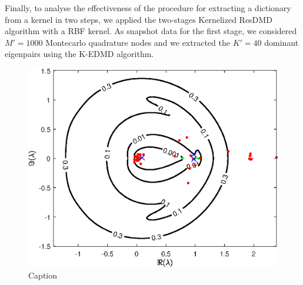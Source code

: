 Finally, to analyse the effectiveness of the procedure for extracting a dictionary from a kernel in two steps, we applied the two-stages Kernelized ResDMD algorithm with a RBF kernel. As snapshot data for the first stage, we considered $M' = 1000$ Montecarlo quadrature nodes and we extracted the $K' = 40$ dominant eigenpairs using the K-EDMD algorithm. 
\begin{figure}[h]
\centering
\includegraphics[width=0.65\linewidth]{../code/figures/gauss_map/kernelized/KEDMD_2step_rbf_Montecarlo.eps}
\caption{Caption}
\label{fig_2steps_kedmd}
\end{figure}
